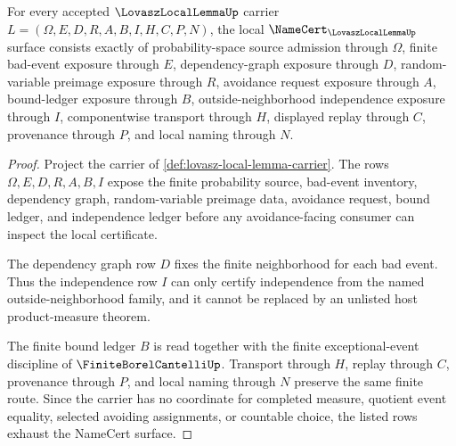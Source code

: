 \begin{theorem}
\label{thm:lovasz-local-lemma-namecert-obligations}
For every accepted $\LovaszLocalLemmaUp$ carrier $L=(\Omega,E,D,R,A,B,I,H,C,P,N)$, the local $\NameCert_{\LovaszLocalLemmaUp}$ surface consists exactly of probability-space source admission through $\Omega$, finite bad-event exposure through $E$, dependency-graph exposure through $D$, random-variable preimage exposure through $R$, avoidance request exposure through $A$, bound-ledger exposure through $B$, outside-neighborhood independence exposure through $I$, componentwise transport through $H$, displayed replay through $C$, provenance through $P$, and local naming through $N$.
\end{theorem}
\begin{proof}
Project the carrier of \autoref{def:lovasz-local-lemma-carrier}. The rows $\Omega,E,D,R,A,B,I$ expose the finite probability source, bad-event inventory, dependency graph, random-variable preimage data, avoidance request, bound ledger, and independence ledger before any avoidance-facing consumer can inspect the local certificate.

The dependency graph row $D$ fixes the finite neighborhood for each bad event. Thus the independence row $I$ can only certify independence from the named outside-neighborhood family, and it cannot be replaced by an unlisted host product-measure theorem.

The finite bound ledger $B$ is read together with the finite exceptional-event discipline of $\FiniteBorelCantelliUp$. Transport through $H$, replay through $C$, provenance through $P$, and local naming through $N$ preserve the same finite route. Since the carrier has no coordinate for completed measure, quotient event equality, selected avoiding assignments, or countable choice, the listed rows exhaust the NameCert surface.
\end{proof}



